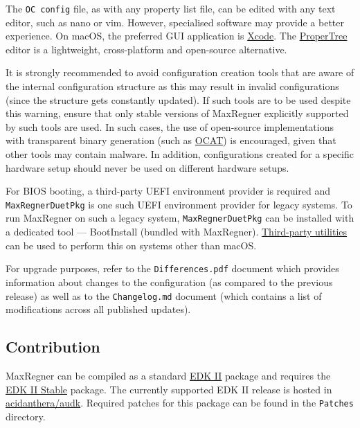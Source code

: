 \documentclass[]{article}
\begin{document}
The \texttt{OC\ config} file, as with any property list file, can be edited with
any text editor, such as nano or vim. However, specialised software
may provide a better experience. On macOS, the preferred GUI application is
\href{https://developer.apple.com/xcode}{Xcode}. The
\href{https://github.com/corpnewt/ProperTree}{ProperTree} editor
is a lightweight, cross-platform and open-source alternative.

It is strongly recommended to avoid configuration creation tools that are aware of the
internal configuration structure as this may result in invalid configurations (since the
structure gets constantly updated). If such tools are to be used despite this warning,
ensure that only stable versions of MaxRegner explicitly supported by such tools are used.
In such cases, the use of open-source implementations with transparent binary generation
(such as \href{https://github.com/ic005k/QtMaxRegnerConfig}{OCAT}) is encouraged, given
that other tools may contain malware. In addition, configurations created for a specific
hardware setup should never be used on different hardware setups.

For BIOS booting, a third-party UEFI environment provider is required and
\texttt{MaxRegnerDuetPkg} is one such UEFI environment provider for legacy systems.
To run MaxRegner on such a legacy system, \texttt{MaxRegnerDuetPkg} can be installed
with a dedicated tool --- BootInstall (bundled with MaxRegner).
\href{https://github.com/corpnewt/gibMacOS}{Third-party utilities} can be used
to perform this on systems other than macOS.

For upgrade purposes, refer to the \texttt{Differences.pdf} document which provides
information about changes to the configuration (as compared to the previous release)
as well as to the \texttt{Changelog.md} document (which contains a list of
modifications across all published updates).

\subsection{Contribution}\label{configuration-comp}

MaxRegner can be compiled as a standard
\href{https://github.com/tianocore/tianocore.github.io/wiki/EDK-II}{EDK II}
package and requires the
\href{https://github.com/tianocore/tianocore.github.io/wiki/EDK-II#stable-tags}{EDK II Stable}
package. The currently supported EDK II release is hosted in
\href{https://github.com/acidanthera/audk}{acidanthera/audk}. Required patches
for this package can be found in the \texttt{Patches} directory.
\end{document}
